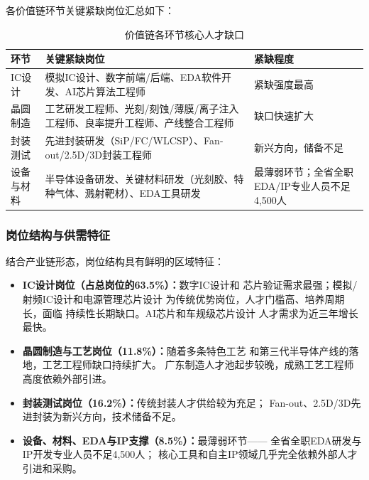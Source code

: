\documentclass[12pt,a4paper]{article}
\newcommand{\tableHeaderRow}{\rowcolor{tealPrimary}\color{white}}
\newcommand{\tableOddRow}{\rowcolor{mintBG}}
\newcommand{\tableEvenRow}{\rowcolor{white}}
\begin{document}
各价值链环节关键紧缺岗位汇总如下：

\begin{table}[H]
\centering
\caption{价值链各环节核心人才缺口}
\label{tab:talent_shortage}
\begin{tabular}{p{2.5cm}p{7cm}p{3.5cm}}
\toprule
\tableHeaderRow
\textbf{环节} & \textbf{关键紧缺岗位} & \textbf{紧缺程度} \\
\midrule
\tableOddRow  IC设计 & 模拟IC设计、数字前端/后端、EDA软件开发、AI芯片算法工程师 & 紧缺强度最高 \\
\tableEvenRow 晶圆制造 & 工艺研发工程师、光刻/刻蚀/薄膜/离子注入工程师、良率提升工程师、产线整合工程师 & 缺口快速扩大 \\
\tableOddRow  封装测试 & 先进封装研发（SiP/FC/WLCSP）、Fan-out/2.5D/3D封装工程师 & 新兴方向，储备不足 \\
\tableEvenRow 设备与材料 & 半导体设备研发、关键材料研发（光刻胶、特种气体、溅射靶材）、EDA工具研发 & 最薄弱环节；全省全职EDA/IP专业人员不足4,500人 \\
\bottomrule
\end{tabular}
\end{table}

\subsubsection{岗位结构与供需特征}

结合产业链形态，岗位结构具有鲜明的区域特征：

\begin{itemize}
    \item \textbf{IC设计岗位（占总岗位的63.5\%）：}数字IC设计和
          芯片验证需求最强；模拟/射频IC设计和电源管理芯片设计
          为传统优势岗位，人才门槛高、培养周期长，面临
          持续性长期缺口。AI芯片和车规级芯片设计
          人才需求为近三年增长最快。
    \item \textbf{晶圆制造与工艺岗位（11.8\%）：}随着多条特色工艺
          和第三代半导体产线的落地，工艺工程师缺口持续扩大。
          广东制造人才池起步较晚，成熟工艺工程师
          高度依赖外部引进。
    \item \textbf{封装测试岗位（16.2\%）：}传统封装人才供给较为充足；
          Fan-out、2.5D/3D先进封装为新兴方向，技术储备不足。
    \item \textbf{设备、材料、EDA与IP支撑（8.5\%）：}最薄弱环节——
          全省全职EDA研发与IP开发专业人员不足4,500人；
          核心工具和自主IP领域几乎完全依赖外部人才引进和采购。
\end{itemize}
\end{document}
